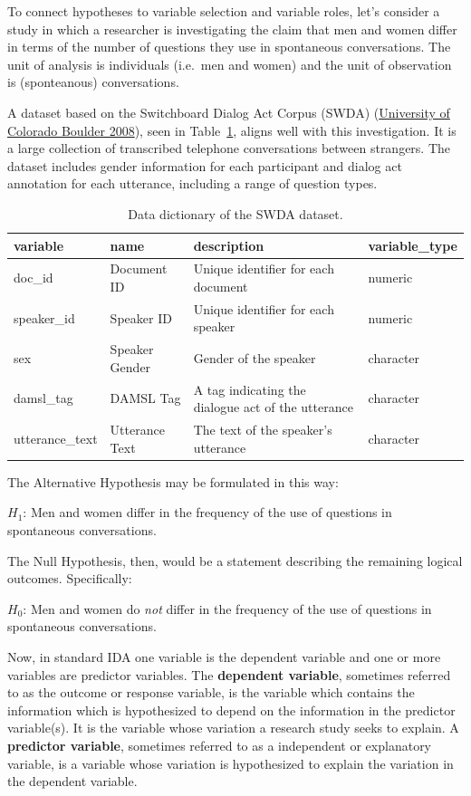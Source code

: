 \documentclass[
  letterpaper,
  DIV=11,
  numbers=noendperiod]{scrreport}
\theoremstyle{definition}
\theoremstyle{remark}
\begin{document}
To connect hypotheses to variable selection and variable roles, let's
consider a study in which a researcher is investigating the claim that
men and women differ in terms of the number of questions they use in
spontaneous conversations. The unit of analysis is individuals (i.e.~men
and women) and the unit of observation is (sponteanous) conversations.

A dataset based on the Switchboard Dialog Act Corpus (SWDA)
(\protect\hyperlink{ref-SWDA2008}{University of Colorado Boulder 2008}),
seen in Table~\ref{tbl-aa-ida-swda-dataset}, aligns well with this
investigation. It is a large collection of transcribed telephone
conversations between strangers. The dataset includes gender information
for each participant and dialog act annotation for each utterance,
including a range of question types.

\hypertarget{tbl-aa-ida-swda-dataset}{}
\begin{table}
\caption{\label{tbl-aa-ida-swda-dataset}Data dictionary of the SWDA dataset. }\tabularnewline

\centering
\begin{tabular}{l|l|l|l}
\hline
variable & name & description & variable\_type\\
\hline
doc\_id & Document ID & Unique identifier for each document & numeric\\
\hline
speaker\_id & Speaker ID & Unique identifier for each speaker & numeric\\
\hline
sex & Speaker Gender & Gender of the speaker & character\\
\hline
damsl\_tag & DAMSL Tag & A tag indicating the dialogue act of the utterance & character\\
\hline
utterance\_text & Utterance Text & The text of the speaker's utterance & character\\
\hline
\end{tabular}
\end{table}

The Alternative Hypothesis may be formulated in this way:

\(H_1\): Men and women differ in the frequency of the use of questions
in spontaneous conversations.

The Null Hypothesis, then, would be a statement describing the remaining
logical outcomes. Specifically:

\(H_0\): Men and women do \emph{not} differ in the frequency of the use
of questions in spontaneous conversations.

Now, in standard IDA one variable is the dependent variable and one or
more variables are predictor variables. The \textbf{dependent variable},
sometimes referred to as the outcome or response variable, is the
variable which contains the information which is hypothesized to depend
on the information in the predictor variable(s). It is the variable
whose variation a research study seeks to explain. A \textbf{predictor
variable}, sometimes referred to as a independent or explanatory
variable, is a variable whose variation is hypothesized to explain the
variation in the dependent variable.
\end{document}
